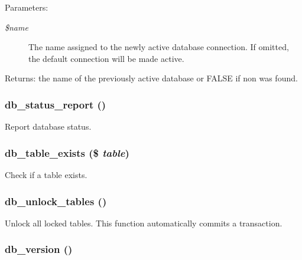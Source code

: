 \begin{Desc}
\item[Parameters:]
\begin{description}
\item[{\em \$name}]The name assigned to the newly active database connection. If omitted, the default connection will be made active.\end{description}
\end{Desc}
\begin{Desc}
\item[Returns:]the name of the previously active database or FALSE if non was found. \end{Desc}
\hypertarget{group__database_g0f08b7a80942b33cdc67eebc95e0ee6b}{
\subsubsection[{db\_\-status\_\-report}]{\setlength{\rightskip}{0pt plus 5cm}db\_\-status\_\-report ()}}
\label{group__database_g0f08b7a80942b33cdc67eebc95e0ee6b}


Report database status. \hypertarget{group__database_g78809300cee80db034832825aed55b70}{
\subsubsection[{db\_\-table\_\-exists}]{\setlength{\rightskip}{0pt plus 5cm}db\_\-table\_\-exists (\$ {\em table})}}
\label{group__database_g78809300cee80db034832825aed55b70}


Check if a table exists. \hypertarget{group__database_g827df02252c1d606c685b768807b7181}{
\subsubsection[{db\_\-unlock\_\-tables}]{\setlength{\rightskip}{0pt plus 5cm}db\_\-unlock\_\-tables ()}}
\label{group__database_g827df02252c1d606c685b768807b7181}


Unlock all locked tables. This function automatically commits a transaction. \hypertarget{group__database_g6736a6897048ff0167a0bbe5e374fc13}{
\subsubsection[{db\_\-version}]{\setlength{\rightskip}{0pt plus 5cm}db\_\-version ()}}
\label{group__database_g6736a6897048ff0167a0bbe5e374fc13}


